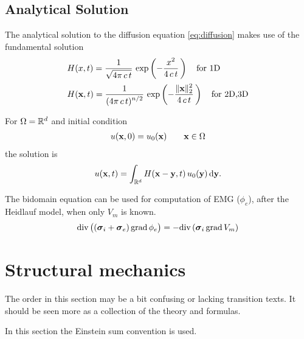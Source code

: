 \subsection{Analytical Solution}
The analytical solution to the diffusion equation \eqref{eq:diffusion} makes use of the fundamental solution
\begin{equation*}
  \begin{array}{lll}
    H(x,t) = \displaystyle\frac{\displaystyle{1}}{\displaystyle{\sqrt{4\pi\,c\,t}}}\,\exp\left(-\displaystyle\frac{\displaystyle{x^2}}{\displaystyle{4\,c\,t}}\,\right) \quad \text{for 1D}\\[4mm]
    H(\textbf{x},t) = \displaystyle\frac{\displaystyle{1}}{\displaystyle{(4\pi\,c\,t)^{n/2}}}\,\exp\left(-\displaystyle\frac{\displaystyle{\Vert \textbf{x}\Vert_2^2}}{\displaystyle{4\,c\,t}}\,\right) \quad \text{for 2D,3D}\\[4mm]
  \end{array}
\end{equation*}
For $\Omega=\mathbb{R}^d$ and initial condition
\begin{equation*}
  \begin{array}{lll}
    u(\textbf{x},0) = u_0(\textbf{x})\qquad \textbf{x} \in \Omega
  \end{array}
\end{equation*}
the solution is
\begin{equation*}
  \begin{array}{lll}
    u(\bfx,t) = \ds\int_{\R^d} H(\bfx - \bfy,t)\,u_0(\bfy)\,\d \bfy.
  \end{array}
\end{equation*}

    
The bidomain equation can be used for computation of EMG ($\phi_e$), after the Heidlauf model, when only $V_m$ is known.
\begin{equation*}
  \begin{array}{lll}
    \hbox{div} \,\big((\boldsymbol{\sigma}_i + \boldsymbol{\sigma}_e)\,\hbox{grad} \, \phi_e\big) = - \hbox{div} \,(\boldsymbol{\sigma}_i\,\hbox{grad} \, V_m)
  \end{array}
\end{equation*}

\section{Structural mechanics}
The order in this section may be a bit confusing or lacking transition texts. It should be seen more as a collection of the theory and formulas.

In this section the Einstein sum convention is used.

